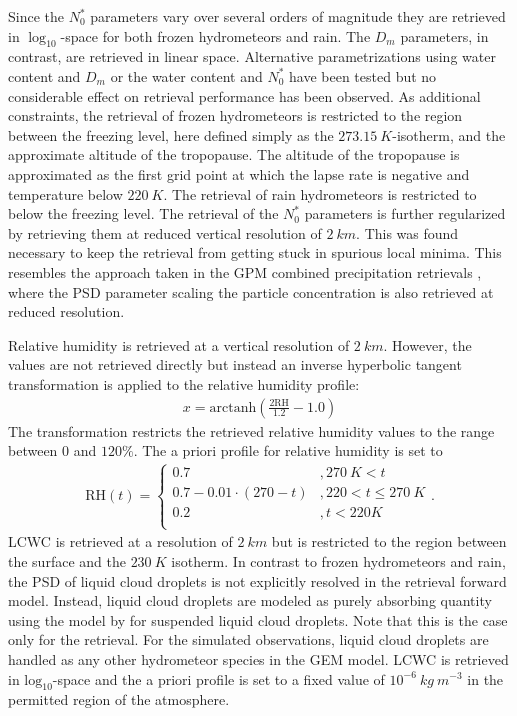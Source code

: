 \documentclass[journal abbreviation, manuscript]{copernicus}
\begin{document}
Since the $N_0^*$ parameters vary over several orders of magnitude they are
retrieved in $\log_{10}$-space for both frozen hydrometeors and rain. The $D_m$
parameters, in contrast, are retrieved in linear space. Alternative
parametrizations using water content and $D_m$ or the water content and $N_0^*$
have been tested but no considerable effect on retrieval performance has been
observed. As additional constraints, the retrieval of frozen hydrometeors is
restricted to the region between the freezing level, here defined simply as the
$273.15\ \unit{K}$-isotherm, and the approximate altitude of the tropopause. The
altitude of the tropopause is approximated as the first grid point at which the
lapse rate is negative and temperature below $220\ \unit{K}$. The retrieval of
rain hydrometeors is restricted to below the freezing level. The retrieval of
the $N_0^*$ parameters is further regularized by retrieving them at reduced
vertical resolution of $2\ \unit{km}$. This was found necessary to keep the
retrieval from getting stuck in spurious local minima. This resembles the
approach taken in the GPM combined precipitation retrievals \citep{grecu16},
where the PSD parameter scaling the particle concentration is also
retrieved at reduced resolution.

Relative humidity is retrieved at a vertical resolution of $2\ \unit{km}$.
However, the values are not retrieved directly but instead an inverse
hyperbolic tangent transformation is applied to the relative humidity profile:
%
\begin{align}
x = \text{arctanh}(\frac{2 \text{RH}}{1.2} - 1.0)
\end{align}
%
The transformation restricts the retrieved relative humidity values to the range
between $0$ and $120\%$. The a priori profile for relative humidity is set to
%
\begin{align}
\text{RH}(t) = \begin{cases}
 0.7 &, 270\ \unit{K} < t \\
 0.7 - 0.01 \cdot (270 -t) & ,220 < t \leq  270\ \unit{K} \\
 0.2 &,t < 220 \unit{K} \\
 \end{cases}.
\end{align}
%
LCWC is retrieved at a resolution of $2\ \unit{km}$ but is restricted to the
region between the surface and the $230\ \unit{K}$ isotherm. In contrast to
frozen hydrometeors and rain, the PSD of liquid cloud droplets is not explicitly
resolved in the retrieval forward model. Instead, liquid cloud droplets are
modeled as purely absorbing quantity using the model by \cite{liebe93} for
suspended liquid cloud droplets. Note that this is the case only for the
retrieval. For the simulated observations, liquid cloud droplets are
handled as any other hydrometeor species in the GEM model. LCWC is retrieved in
$\text{log}_{10}$-space and the a priori profile is set to a fixed value of
$10^{-6}\ \unit{kg\ m^{-3}}$ in the permitted region of the atmosphere.
\end{document}

